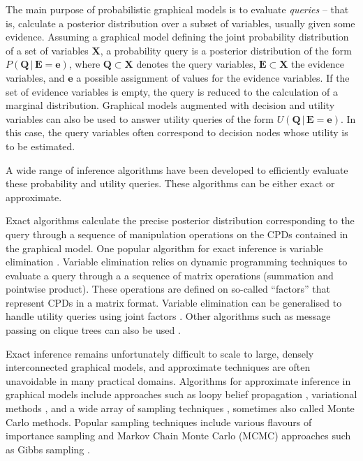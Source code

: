 The main purpose of probabilistic graphical models is to evaluate \textit{queries} -- that is, calculate a posterior distribution over a subset of variables, usually given some evidence. Assuming a graphical model defining the joint probability distribution of a set of variables $\mathbf{X}$, a probability query is a posterior distribution of the form $P(\mathbf{Q}  \, | \,  \mathbf{E}\!=\!\mathbf{e})$, where $\mathbf{Q} \subset \mathbf{X}$ denotes the query variables, $\mathbf{E} \subset \mathbf{X}$ the evidence variables, and $\mathbf{e}$ a possible assignment of values for the evidence variables.  If the set of evidence variables is empty, the query is reduced to the calculation of a marginal distribution.  Graphical models augmented with decision and utility variables can also be used to answer utility queries of the form $U(\mathbf{Q}   \, | \,  \mathbf{E}\!=\!\mathbf{e})$.  In this case, the query variables often correspond to decision nodes whose utility is to be estimated.

A wide range of inference algorithms have been developed to efficiently evaluate these probability and utility queries. These algorithms can be either exact or approximate.  

Exact algorithms calculate the precise posterior distribution corresponding to the query through a sequence of manipulation operations on the CPDs contained in the graphical model.  One popular algorithm for exact inference is variable elimination \citep{ZhangP96}.  Variable elimination relies on dynamic programming techniques to evaluate a query through a a sequence of matrix operations (summation and pointwise product). These operations are defined on so-called ``factors'' that represent CPDs in a matrix format. Variable elimination can be generalised to handle utility queries using joint factors \citep{Koller+Friedman:09}.   Other algorithms such as message passing on clique trees can also be used \citep{jensen1990}. 

Exact inference remains unfortunately difficult to scale to large, densely interconnected graphical models, and  approximate techniques are often unavoidable in many practical domains.  Algorithms for approximate inference in graphical models include approaches such as loopy belief propagation \citep{Murphy:1999}, variational methods \citep{Jordan:1999},  and a wide array of sampling techniques \citep{mackay1998introduction}, sometimes also called Monte Carlo methods. Popular sampling techniques include various flavours of importance sampling \citep{FungC89,cheng2000ais} and Markov Chain Monte Carlo (MCMC) approaches such as Gibbs sampling \citep{pearl1987evidential,gamerman2006markov}. %

